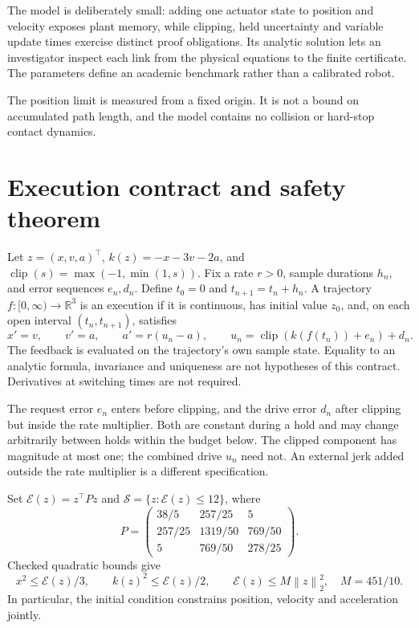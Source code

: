 \documentclass[10pt]{article}
\newcommand{\R}{\mathbb R}
\newcommand{\E}{\mathcal E}
\newcommand{\clip}{\operatorname{clip}}
\newcommand{\norm}[1]{\left\lVert#1\right\rVert}
\begin{document}
The model is deliberately small: adding one actuator state to position and velocity exposes plant memory, while clipping, held uncertainty and variable update times exercise distinct proof obligations. Its analytic solution lets an investigator inspect each link from the physical equations to the finite certificate. The parameters define an academic benchmark rather than a calibrated robot.

The position limit is measured from a fixed origin. It is not a bound on accumulated path length, and the model contains no collision or hard-stop contact dynamics.

\section{Execution contract and safety theorem}
Let $z=(x,v,a)^\top$, $k(z)=-x-3v-2a$, and
$\clip(s)=\max(-1,\min(1,s))$. Fix a rate $r>0$, sample durations $h_n$, and error sequences $e_n,d_n$. Define $t_0=0$ and $t_{n+1}=t_n+h_n$. A trajectory $f:[0,\infty)\to\R^3$ is an execution if it is continuous, has initial value $z_0$, and, on each open interval $(t_n,t_{n+1})$, satisfies
\begin{equation}\label{eq:plant}
 x'=v,\qquad v'=a,\qquad a'=r(u_n-a),\qquad
 u_n=\clip(k(f(t_n))+e_n)+d_n.
\end{equation}
The feedback is evaluated on the trajectory's own sample state. Equality to an analytic formula, invariance and uniqueness are not hypotheses of this contract. Derivatives at switching times are not required.

The request error $e_n$ enters before clipping, and the drive error $d_n$ after clipping but inside the rate multiplier. Both are constant during a hold and may change arbitrarily between holds within the budget below. The clipped component has magnitude at most one; the combined drive $u_n$ need not. An external jerk added outside the rate multiplier is a different specification.

Set $\E(z)=z^\top Pz$ and $\mathcal S=\{z:\E(z)\le12\}$, where
\begin{equation}\label{eq:P}
P=\begin{pmatrix}
38/5&257/25&5\\
257/25&1319/50&769/50\\
5&769/50&278/25
\end{pmatrix}.
\end{equation}
Checked quadratic bounds give
\begin{equation}\label{eq:geometry}
x^2\le\E(z)/3,\qquad k(z)^2\le\E(z)/2,\qquad
\E(z)\le M\norm{z}_2^2,\quad M=451/10.
\end{equation}
In particular, the initial condition constrains position, velocity and acceleration jointly.
\end{document}
